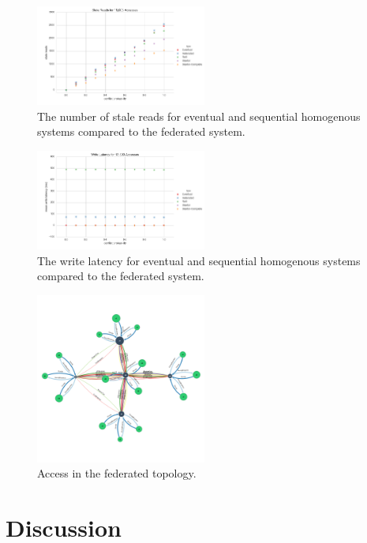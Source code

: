 \documentclass[10pt,conference,compsocconf,letterpaper]{IEEEtran}
\begin{document}
\begin{figure}[h]
    \centering
    \includegraphics[width=0.5\textwidth]{figures/stale_reads}
    \caption{The number of stale reads for eventual and sequential homogenous systems compared to the federated system.}
    \label{fig:stale_reads}
\end{figure}

\begin{figure}[h]
    \centering
    \includegraphics[width=0.5\textwidth]{figures/write_latency}
    \caption{The write latency for eventual and sequential homogenous systems compared to the federated system.}
    \label{fig:write_latency}
\end{figure}

\begin{figure}[h]
    \centering
    \includegraphics[width=0.5\textwidth]{figures/federated}
    \caption{Access in the federated topology.}
    \label{fig:federated}
\end{figure}

\section{Discussion}
\end{document}
